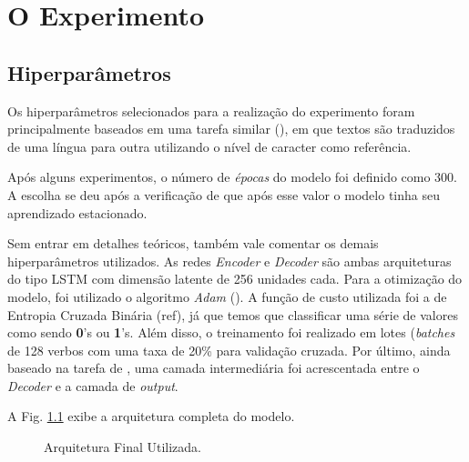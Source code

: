 \chapter{O Experimento}
\label{ch:07}


\section{Hiperparâmetros}
\label{sec:treinamento}

Os hiperparâmetros selecionados para a realização do experimento foram principalmente baseados em uma tarefa similar (\cite{cholletseq2seq}), em que textos são traduzidos de uma língua para outra utilizando o nível de caracter como referência.

Após alguns experimentos, o número de \textit{épocas} do modelo foi definido como 300. A escolha se deu após a verificação de que após esse valor o modelo tinha seu aprendizado estacionado.

Sem entrar em detalhes teóricos, também vale comentar os demais hiperparâmetros utilizados. As redes \textit{Encoder} e \textit{Decoder} são ambas arquiteturas do tipo LSTM com dimensão latente de 256 unidades cada. Para a otimização do modelo, foi utilizado o algoritmo \textit{Adam} (\cite{adam:2014}). A função de custo utilizada foi a de Entropia Cruzada Binária (ref), já que temos que classificar uma série de valores como sendo \textbf{0}'s ou \textbf{1}'s. Além disso, o treinamento foi realizado em lotes (\textit{batches} de 128 verbos com uma taxa de 20\% para validação cruzada. Por último, ainda baseado na tarefa de \cite{cholletseq2seq}, uma camada intermediária foi acrescentada entre o \textit{Decoder} e a camada de \textit{output}.

A Fig. \ref{fig:encoder-decoder} exibe a arquitetura completa do modelo.

\begin{figure}[!htb]
\caption{\label{fig:encoder-decoder} Arquitetura Final Utilizada.}
\end{figure}

